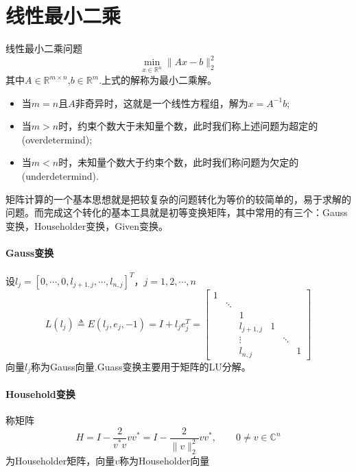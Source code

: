 \documentclass[UTF8]{article}
\begin{document}
\section{线性最小二乘}
\begin{flushleft}
线性最小二乘问题
$$\min_{x\in\mathbb{R}^n}\parallel{Ax-b}\parallel _2^2$$
其中$A\in\mathbb{R}^{m \times n}$,$b\in\mathbb{R}^m$.上式的解称为最小二乘解。
\begin{itemize}
\item 当$m=n$且$A$非奇异时，这就是一个线性方程组，解为$x=A^{-1}b$;
\item 当$m>n$时，约束个数大于未知量个数，此时我们称上述问题为\textcolor[rgb]{0.00,0.07,1.00}{超定的(overdetermind)};
\item 当$m<n$时，未知量个数大于约束个数，此时我们称问题为\textcolor[rgb]{0.00,0.07,1.00}{欠定的(underdetermind).}
\end{itemize}

矩阵计算的一个基本思想就是把较复杂的问题转化为等价的较简单的，易于求解的问题。而完成这个转化的基本工具就是初等变换矩阵，其中常用的有三个：\textcolor[rgb]{0.00,0.07,1.00}{Gauss变换}，\textcolor[rgb]{0.00,0.07,1.00}{Householder变换}，\textcolor[rgb]{0.00,0.07,1.00}{Given变换}。

\paragraph{Gauss变换}
设$l_j=[0,\cdots,0,l_{j+1,j},\cdots,l_{n,j}]^T$，$j=1,2,\cdots,n$
$$
L(l_j)\triangleq E(l_j,e_j,-1)=I+l_je_j^T=
\begin{bmatrix}
1 & & & &  \\
 & \ddots & & & & \\
 &  & 1 & & & \\
 &  & l_{j+1,j} & 1 & & \\
 &  & \vdots & & \ddots &  \\
 &  & l_{n,j} &  &  & 1
\end{bmatrix}
$$
向量$l_j$称为\textcolor[rgb]{0.00,0.07,1.00}{Gauss向量}.Guass变换主要用于矩阵的LU分解。

\paragraph{Household变换}
称矩阵
$$
H=I-\frac{2}{v^*v}vv^* =I-\frac{2}{\parallel v \parallel_2^2}vv^*, \qquad 0 \neq v \in\mathbb{C}^n
$$
为\textcolor[rgb]{0.00,0.07,1.00}{Householder矩阵}，向量$v$称为\textcolor[rgb]{0.00,0.07,1.00}{Householder向量}


\end{flushleft}
\end{document}
